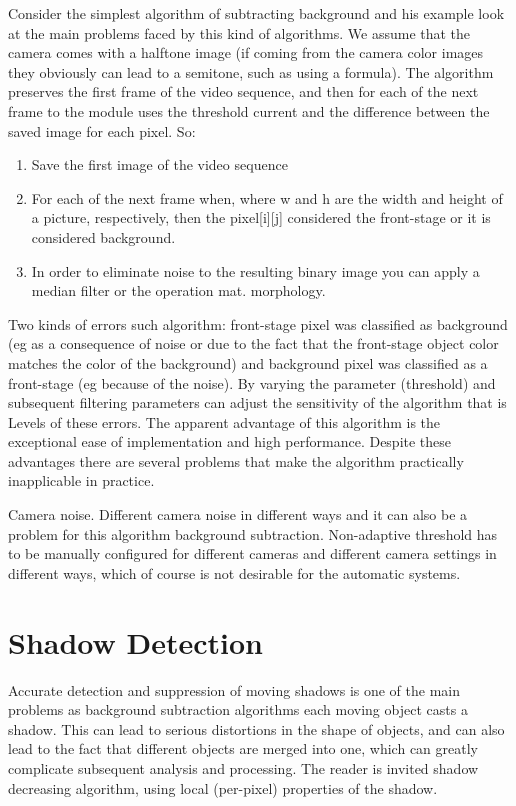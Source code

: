 Consider the simplest algorithm of subtracting background and his example look at the main problems faced by this kind of algorithms. We assume that the camera comes with a halftone image (if coming from the camera color images they obviously can lead to a semitone, such as using a formula). The algorithm preserves the first frame of the video sequence, and then for each of the next frame to the module uses the threshold current and the difference between the saved image for each pixel. So:

\begin{enumerate}
    
    \item Save the first image of the video sequence
    \item For each of the next frame when, where w and h are the width and height of a picture, respectively, then the pixel[i][j] considered the front-stage or it is considered background.
    \item In order to eliminate noise to the resulting binary image you can apply a median filter or the operation mat. morphology. \cite{Neri}
    
\end{enumerate}

Two kinds of errors such algorithm: front-stage pixel was classified as background (eg as a consequence of noise or due to the fact that the front-stage object color matches the color of the background) and background pixel was classified as a front-stage (eg because of the noise). By varying the parameter (threshold) and subsequent filtering parameters can adjust the sensitivity of the algorithm that is Levels of these errors. The apparent advantage of this algorithm is the exceptional ease of implementation and high performance. Despite these advantages there are several problems that make the algorithm practically inapplicable in practice.

Camera noise. Different camera noise in different ways and it can also be a problem for this algorithm background subtraction. Non-adaptive threshold has to be manually configured for different cameras and different camera settings in different ways, which of course is not desirable for the automatic systems.

\section{Shadow Detection}

Accurate detection and suppression of moving shadows is one of the main problems as background subtraction algorithms each moving object casts a shadow. This can lead to serious distortions in the shape of objects, and can also lead to the fact that different objects are merged into one, which can greatly complicate subsequent analysis and processing. The reader is invited shadow decreasing algorithm, using local (per-pixel) properties of the shadow.

